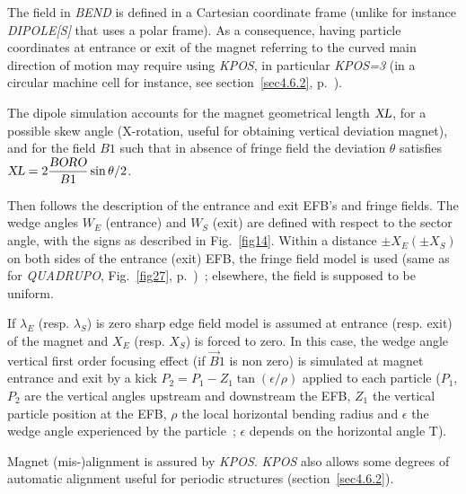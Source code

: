 \bigskip

\noindent The field in \textsl{BEND}  is defined in a Cartesian coordinate frame (unlike for instance \textsl{DIPOLE[S]} 
that uses a polar frame).  As a consequence, having particle coordinates at entrance  or exit of the magnet 
referring to the  curved  main direction of motion may 
require using \textsl{KPOS}, in particular \textsl{KPOS=3}  (in a circular machine cell for instance, 
see section~\ref{sec4.6.2}, p.~\pageref{sec4.6.2}). 

\bigskip

\noindent The dipole simulation accounts for the magnet geometrical length $ \textsl{XL} $, for a possible 
 skew angle (X-rotation, useful for obtaining vertical deviation magnet), and for the 
field $ B1 $  such that   in absence of fringe field the deviation $\theta$ satisfies 
$ \textsl{XL} = 2 \dfrac{\textsl{BORO}}{B1} \sin \theta/2$. 

\bigskip

\noindent Then follows the description of the entrance and exit EFB's and
fringe fields.       The wedge angles $W_E $ 
(entrance) and $W_S $ (exit) are defined with respect to the sector angle, 
with the signs as described in Fig.~\ref{fig14}.  
Within a distance $ \pm X_E(\pm X_S) $ on both sides of the entrance (exit) EFB, 
the fringe field model is used (same as for \textsl{QUADRUPO}, 
Fig.~\ref{fig27}, p.~\pageref{fig27})~; elsewhere, the field is supposed to be uniform. 

\bigskip

\noindent If $\lambda_{E} $ (resp. $\lambda_{S} $) is zero sharp edge field model is assumed at entrance 
(resp. exit) of the magnet and $X_E$ (resp. $X_S$) is forced to zero.  In this case, the wedge angle vertical first order 
focusing effect (if $\vec  B1$ is non zero) is simulated at magnet entrance and exit by a kick 
$P_2 = P_1 - Z_1 \tan (\epsilon / \rho)$ applied to each particle ($P_1$, $P_2$ are the vertical angles 
upstream and downstream the EFB, $Z_1$ the vertical particle position at the EFB, $\rho$ the local horizontal 
bending radius and $\epsilon$ the wedge angle experienced by the particle~; $\epsilon$ depends on the horizontal angle T).


\bigskip

\noindent Magnet (mis-)alignment is assured by \textsl{KPOS}. 
\textsl{KPOS} also  allows some degrees of automatic alignment useful for periodic structures (section~\ref{sec4.6.2}).

